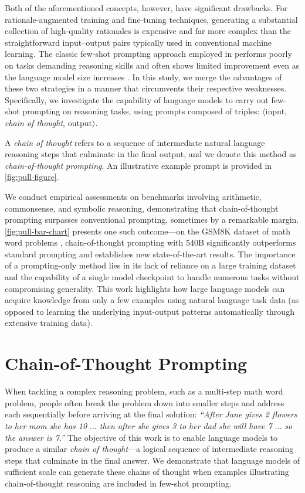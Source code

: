 Both of the aforementioned concepts, however, have significant drawbacks. For rationale-augmented training and fine-tuning techniques, generating a substantial collection of high-quality rationales is expensive and far more complex than the straightforward input--output pairs typically used in conventional machine learning. The classic few-shot prompting approach employed in \citet{brown2020language} performs poorly on tasks demanding reasoning skills and often shows limited improvement even as the language model size increases \citep{rae2021scaling}. In this study, we merge the advantages of these two strategies in a manner that circumvents their respective weaknesses. Specifically, we investigate the capability of language models to carry out few-shot prompting on reasoning tasks, using prompts composed of triples: $\langle$input, \emph{chain of thought}, output$\rangle$.

A \emph{chain of thought} refers to a sequence of intermediate natural language reasoning steps that culminate in the final output, and we denote this method as \textit{chain-of-thought prompting}. An illustrative example prompt is provided in \cref{fig:pull-figure}.

We conduct empirical assessments on benchmarks involving arithmetic, commonsense, and symbolic reasoning, demonstrating that chain-of-thought prompting surpasses conventional prompting, sometimes by a remarkable margin. \cref{fig:pull-bar-chart} presents one such outcome—on the GSM8K dataset of math word problems \citep{cobbe2021training}, chain-of-thought prompting with \palm{} 540B significantly outperforms standard prompting and establishes new state-of-the-art results. The importance of a prompting-only method lies in its lack of reliance on a large training dataset and the capability of a single model checkpoint to handle numerous tasks without compromising generality. This work highlights how large language models can acquire knowledge from only a few examples using natural language task data (as opposed to learning the underlying input-output patterns automatically through extensive training data).

\section{Chain-of-Thought Prompting} When tackling a complex reasoning problem, such as a multi-step math word problem, people often break the problem down into smaller steps and address each sequentially before arriving at the final solution: \textit{``After Jane gives 2 flowers to her mom she has 10 $\ldots$ then after she gives 3 to her dad she will have 7 $\ldots$ so the answer is 7.''} The objective of this work is to enable language models to produce a similar \textit{chain of thought}—a logical sequence of intermediate reasoning steps that culminate in the final answer. We demonstrate that language models of sufficient scale can generate these chains of thought when examples illustrating chain-of-thought reasoning are included in few-shot prompting.

